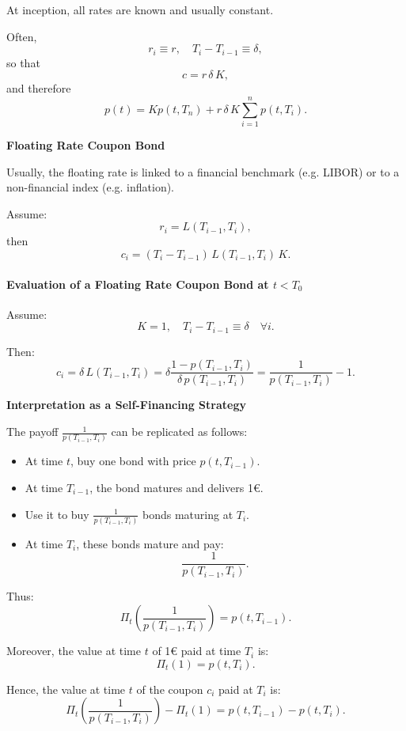 \documentclass[12pt,a4paper]{article}
\theoremstyle{definition}
\begin{document}
At inception, all rates are known and usually constant.

Often,
\[
r_i \equiv r, \quad T_i - T_{i-1} \equiv \delta,
\]
so that
\[
c = r \, \delta \, K,
\]
and therefore
\[
p(t) = K p(t, T_n) + r \, \delta \, K \sum_{i=1}^n p(t, T_i).
\]

\textbf{Floating Rate Coupon Bond}

Usually, the floating rate is linked to a financial benchmark (e.g. LIBOR) or to a non-financial index (e.g. inflation).

Assume:
\[
r_i = L(T_{i-1}, T_i),
\]
then
\[
c_i = (T_i - T_{i-1}) \, L(T_{i-1}, T_i) \, K.
\]

\paragraph{Evaluation of a Floating Rate Coupon Bond at $t < T_0$}

Assume:
\[
K = 1, \quad T_i - T_{i-1} \equiv \delta \quad \forall i.
\]

Then:
\[
c_i = \delta \, L(T_{i-1}, T_i) = \delta \frac{1 - p(T_{i-1}, T_i)}{\delta \, p(T_{i-1}, T_i)} = \frac{1}{p(T_{i-1}, T_i)} - 1.
\]

\textbf{Interpretation as a Self-Financing Strategy}

The payoff $\frac{1}{p(T_{i-1}, T_i)}$ can be replicated as follows:

\begin{itemize}
\item At time $t$, buy one bond with price $p(t, T_{i-1})$.

\item At time $T_{i-1}$, the bond matures and delivers 1€.

\item Use it to buy $\frac{1}{p(T_{i-1}, T_i)}$ bonds maturing at $T_i$.

\item At time $T_i$, these bonds mature and pay:
\[
\frac{1}{p(T_{i-1}, T_i)}.
\]
\end{itemize}

Thus:
\[
\Pi_t\!\left(\frac{1}{p(T_{i-1}, T_i)}\right) = p(t, T_{i-1}).
\]

Moreover, the value at time $t$ of 1€ paid at time $T_i$ is:
\[
\Pi_t(1) = p(t, T_i).
\]

Hence, the value at time $t$ of the coupon $c_i$ paid at $T_i$ is:
\[
\Pi_t\!\left(\frac{1}{p(T_{i-1}, T_i)}\right) - \Pi_t(1) = p(t, T_{i-1}) - p(t, T_i).
\]
\end{document}
